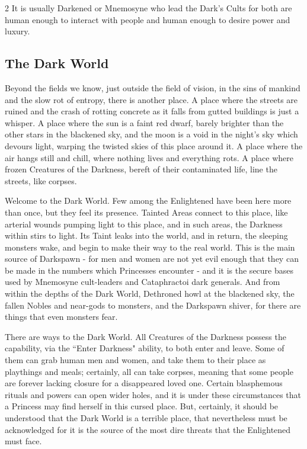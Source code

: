 \begin{multicols}{2}
It is usually Darkened or Mnemosyne who lead the Dark's Cults for both are human enough to interact with people and human enough to desire power and luxury. 

\subsection*{The Dark World}
\label{sec:TheDarkWorld}

Beyond the fields we know, just outside the field of vision, in the sins of mankind and the slow rot of entropy, there is another place. A place where the streets are ruined and the crash of rotting concrete as it falls from gutted buildings is just a whisper. A place where the sun is a faint red dwarf, barely brighter than the other stars in the blackened sky, and the moon is a void in the night's sky which devours light, warping the twisted skies of this place around it. A place where the air hangs still and chill, where nothing lives and everything rots. A place where frozen Creatures of the Darkness, bereft of their contaminated life, line the streets, like corpses.

Welcome to the Dark World. Few among the Enlightened have been here more than once, but they feel its presence. Tainted Areas connect to this place, like arterial wounds pumping light to this place, and in such areas, the Darkness within stirs to light. Its Taint leaks into the world, and in return, the sleeping monsters wake, and begin to make their way to the real world. This is the main source of Darkspawn - for men and women are not yet evil enough that they can be made in the numbers which Princesses encounter - and it is the secure bases used by Mnemosyne cult-leaders and Cataphractoi dark generals. And from within the depths of the Dark World, Dethroned howl at the blackened sky, the fallen Nobles and near-gods to monsters, and the Darkspawn shiver, for there are things that even monsters fear.

There are ways to the Dark World. All Creatures of the Darkness possess the capability, via the \textquotedblleft Enter Darkness" ability, to both enter and leave. Some of them can grab human men and women, and take them to their place as playthings and meals; certainly, all can take corpses, meaning that some people are forever lacking closure for a disappeared loved one. Certain blasphemous rituals and powers can open wider holes, and it is under these circumstances that a Princess may find herself in this cursed place. But, certainly, it should be understood that the Dark World is a terrible place, that nevertheless must be acknowledged for it is the source of the most dire threats that the Enlightened must face. 


\end{multicols}
